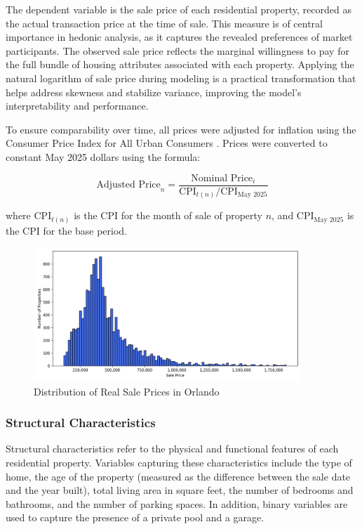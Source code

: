 The dependent variable is the sale price of each residential property, recorded as the actual transaction price at the time of sale. This measure is of central importance in hedonic analysis, as it captures the revealed preferences of market participants. The observed sale price reflects the marginal willingness to pay for the full bundle of housing attributes associated with each property. Applying the natural logarithm of sale price during modeling is a practical transformation that helps address skewness and stabilize variance, improving the model’s interpretability and performance.

To ensure comparability over time, all prices were adjusted for inflation using the Consumer Price Index for All Urban Consumers \citep{bls:2024}. Prices were converted to constant May 2025 dollars using the formula:

\[
\text{Adjusted Price}_n = \frac{\text{Nominal Price}_i}{\text{CPI}_{t(n)} / \text{CPI}_{\text{May 2025}}}
\]

\noindent where $\text{CPI}_{t(n)}$ is the CPI for the month of sale of property $n$, and
$\text{CPI}_{\text{May 2025}}$ is the CPI for the base period.


\begin{figure}[H]
	\centering
	\includegraphics[width=0.9\textwidth]{Figures/sale_price_distribution.png}
    \caption{Distribution of Real Sale Prices in Orlando}
	\label{fig:1}
\end{figure}


\subsubsection*{Structural Characteristics}

Structural characteristics refer to the physical and functional features of each residential property. Variables capturing these characteristics include the type of home, the age of the property (measured as the difference between the sale date and the year built), total living area in square feet, the number of bedrooms and bathrooms, and the number of parking spaces. In addition, binary variables are used to capture the presence of a private pool and a garage.

